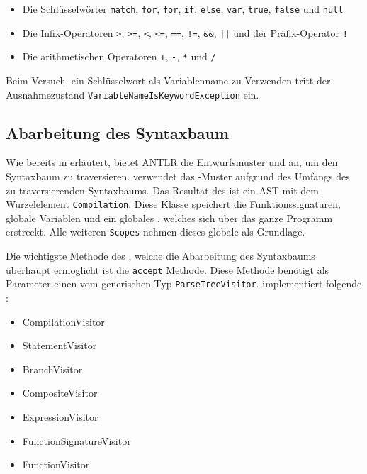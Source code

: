 \begin{itemize}
    \item Die Schlüsselwörter \texttt{match}, \texttt{for}, \texttt{for}, \texttt{if}, \texttt{else}, \texttt{var}, \texttt{true}, \texttt{false} und \texttt{null}
    \item Die Infix-Operatoren \texttt{>}, \texttt{>=}, \texttt{<}, \texttt{<=}, \texttt{==}, \texttt{!=}, \texttt{\&\&}, \texttt{||} und der Präfix-Operator \texttt{!}
    \item Die arithmetischen Operatoren \texttt{+}, \texttt{-}, \texttt{*} und \texttt{/}
\end{itemize}

Beim Versuch, ein Schlüsselwort als Variablenname zu Verwenden tritt der Ausnahmezustand \texttt{VariableNameIsKeywordException} ein. 

\subsection{Abarbeitung des Syntaxbaum}

Wie bereits in  erläutert, bietet ANTLR die Entwurfsmuster \visitor und \listener an, um den Syntaxbaum zu traversieren. \Toya verwendet das \visitor-Muster aufgrund des Umfangs des zu traversierenden Syntaxbaums. Das Resultat des \visitors ist ein AST mit dem Wurzelelement \texttt{Compilation}. Diese Klasse speichert die Funktionssignaturen, globale Variablen und ein globales \scope, welches sich über das ganze Programm erstreckt. Alle weiteren \texttt{Scopes} nehmen dieses globale \scope als Grundlage. 

Die wichtigste Methode des \visitor, welche die Abarbeitung des Syntaxbaums überhaupt ermöglicht ist die \texttt{accept} Methode. Diese Methode benötigt als Parameter einen \visitor vom generischen Typ \texttt{ParseTreeVisitor}. \Toya implementiert folgende \visitor:

\begin{itemize}
    \item CompilationVisitor
    \item StatementVisitor
    \item BranchVisitor
    \item CompositeVisitor
    \item ExpressionVisitor
    \item FunctionSignatureVisitor
    \item FunctionVisitor
\end{itemize}

